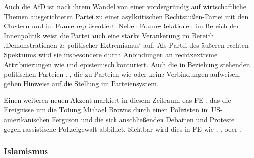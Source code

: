 Auch die AfD ist nach ihrem Wandel von einer vordergründig auf wirtschaftliche Themen ausgerichteten Partei zu einer asylkritischen Rechtsaußen-Partei mit den Clustern  und  im Frame repräsentiert. Neben Frame-Relationen im Bereich der Innenpolitik weist die Partei auch eine starke Verankerung im Bereich ‚Demonstrationen \& politischer Extremismus` auf. Als Partei des äußeren rechten Spektrums wird sie insbesondere durch Anbindungen an rechtxextreme Attribuierungen wie  und  epistemisch konturiert. Auch die in Beziehung stehenden politischen Parteien , , die zu Parteien wie  oder  keine Verbindungen aufweisen, geben Hinweise auf die Stellung im Parteiensystem.

Einen weiteren neuen Akzent markiert in diesem Zeitraum das FE , das die Ereignisse um die Tötung Michael Browns durch einen Polizisten im US-amerikanischen Ferguson und die sich anschließenden Debatten und Proteste gegen rassistische Polizeigewalt abbildet. Sichtbar wird dies in FE wie , ,  oder .

\subsubsection{Islamismus}\label{islamismus-5}

